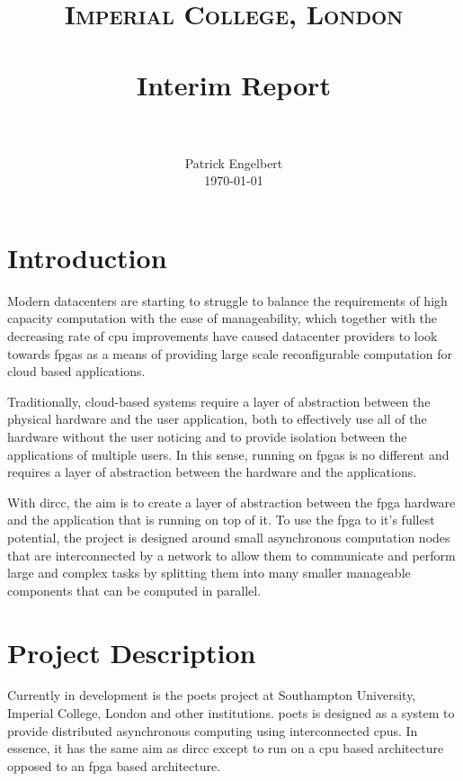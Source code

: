 \documentclass[paper=a4, fontsize=11pt, bibliography=totocnumbered]{scrartcl}
\title{
		\usefont{OT1}{bch}{b}{n}
		\normalfont \normalsize \textsc{Imperial College, London} \\ [25pt]
		\horrule{0.5pt} \\[0.4cm]
		\huge Interim Report \\
		\horrule{2pt} \\[0.5cm]
}
\author{
		\normalfont 								\normalsize
        Patrick Engelbert \\[-3pt]		\normalsize
        \today
}
\date{} %
\numberwithin{equation}{section}		%
\numberwithin{figure}{section}			%
\numberwithin{table}{section}				%
\begin{document}
\maketitle

\clearpage

\tableofcontents

\clearpage

\section{Introduction}

Modern datacenters are starting to struggle to balance the requirements of high capacity computation with the ease of manageability, which together with the decreasing rate of \gls{cpu} improvements have caused datacenter providers to look towards \glspl{fpga} as a means of providing large scale reconfigurable computation for cloud based applications\cite{pub:configurable-cloud-acceleration}. 

Traditionally, cloud-based systems require a layer of abstraction between the physical hardware and the user application, both to effectively use all of the hardware without the user noticing and to provide isolation between the applications of multiple users. In this sense, running on \glspl{fpga} is no different and requires a layer of abstraction between the hardware and the applications.

With \gls{dircc}, the aim is to create a layer of abstraction between the \gls{fpga} hardware and the application that is running on top of it. To use the \gls{fpga} to it's fullest potential, the project is designed around small asynchronous computation nodes that are interconnected by a network to allow them to communicate and perform large and complex tasks by splitting them into many smaller manageable components that can be computed in parallel.

\section{Project Description}

Currently in development is the \gls{poets} project at Southampton University, Imperial College, London and other institutions. \Gls{poets} is designed as a system to provide distributed asynchronous computing using interconnected \glspl{cpu}. In essence, it has the same aim as \gls{dircc} except to run on a \gls{cpu} based architecture opposed to an \gls{fpga} based architecture.
\end{document}
